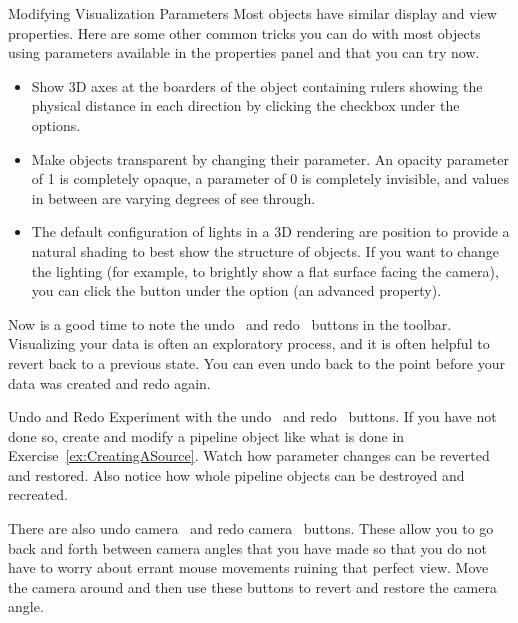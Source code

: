 \begin{exercise}{Modifying Visualization Parameters}
  Most objects have similar display and view properties. Here are some
  other common tricks you can do with most objects using parameters
  available in the properties panel and that you can try now.

  \begin{itemize}
  \item {}  Show 3D axes at
    the boarders of the object containing rulers showing the physical
    distance in each direction by clicking the  checkbox
    under the  options.
  \item {}  Make objects transparent by
    changing their  parameter. An opacity parameter of 1 is
    completely opaque, a parameter of 0 is completely invisible, and values
    in between are varying degrees of see through.
  \item {} The default configuration of lights in a 3D
    rendering are position to provide a natural shading to best show the
    structure of objects. If you want to change the lighting (for example,
    to brightly show a flat surface facing the camera), you can click the
     button under the  option (an advanced
    property).
  \end{itemize}
\end{exercise}


Now is a good time to note the undo~ and
redo~ buttons in the toolbar.  Visualizing your data is
often an exploratory process, and it is often helpful to revert back to a
previous state.  You can even undo back to the point before your data was
created and redo again.

\begin{exercise}{Undo and Redo}
  \label{ex:UndoAndRedo}%
  Experiment with the undo~ and redo~
  buttons.  If you have not done so, create and modify a pipeline object
  like what is done in Exercise~\ref{ex:CreatingASource}.  Watch how
  parameter changes can be reverted and restored.  Also notice how whole
  pipeline objects can be destroyed and recreated.

  There are also undo camera~ and redo
  camera~ buttons.  These allow you to go back and
  forth between camera angles that you have made so that you do not have
  to worry about errant mouse movements ruining that perfect view.  Move
  the camera around and then use these buttons to revert and restore the
  camera angle.
\end{exercise}

